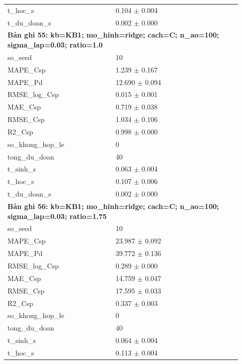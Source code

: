 \begin{longtable}{p{0.43\linewidth}p{0.50\linewidth}}
t\_\allowbreak hoc\_\allowbreak s & 0.104 $\pm$ 0.004 \\
t\_\allowbreak du\_\allowbreak doan\_\allowbreak s & 0.002 $\pm$ 0.000 \\
\midrule
\multicolumn{2}{p{0.95\linewidth}}{\textbf{Bản ghi 55: kb=KB1; mo\_hinh=ridge; cach=C; n\_ao=100; sigma\_lap=0.03; ratio=1.0}} \\
so\_\allowbreak seed & 10 \\
MAPE\_\allowbreak Csp & 1.239 $\pm$ 0.167 \\
MAPE\_\allowbreak Pd & 12.690 $\pm$ 0.094 \\
RMSE\_\allowbreak log\_\allowbreak Csp & 0.015 $\pm$ 0.001 \\
MAE\_\allowbreak Csp & 0.719 $\pm$ 0.038 \\
RMSE\_\allowbreak Csp & 1.034 $\pm$ 0.106 \\
R2\_\allowbreak Csp & 0.998 $\pm$ 0.000 \\
so\_\allowbreak khong\_\allowbreak hop\_\allowbreak le & 0 \\
tong\_\allowbreak du\_\allowbreak doan & 40 \\
t\_\allowbreak sinh\_\allowbreak s & 0.063 $\pm$ 0.004 \\
t\_\allowbreak hoc\_\allowbreak s & 0.107 $\pm$ 0.006 \\
t\_\allowbreak du\_\allowbreak doan\_\allowbreak s & 0.002 $\pm$ 0.000 \\
\midrule
\multicolumn{2}{p{0.95\linewidth}}{\textbf{Bản ghi 56: kb=KB1; mo\_hinh=ridge; cach=C; n\_ao=100; sigma\_lap=0.03; ratio=1.75}} \\
so\_\allowbreak seed & 10 \\
MAPE\_\allowbreak Csp & 23.987 $\pm$ 0.092 \\
MAPE\_\allowbreak Pd & 39.772 $\pm$ 0.136 \\
RMSE\_\allowbreak log\_\allowbreak Csp & 0.289 $\pm$ 0.000 \\
MAE\_\allowbreak Csp & 14.759 $\pm$ 0.047 \\
RMSE\_\allowbreak Csp & 17.595 $\pm$ 0.033 \\
R2\_\allowbreak Csp & 0.337 $\pm$ 0.003 \\
so\_\allowbreak khong\_\allowbreak hop\_\allowbreak le & 0 \\
tong\_\allowbreak du\_\allowbreak doan & 40 \\
t\_\allowbreak sinh\_\allowbreak s & 0.064 $\pm$ 0.004 \\
t\_\allowbreak hoc\_\allowbreak s & 0.113 $\pm$ 0.004 \\

\end{longtable}
